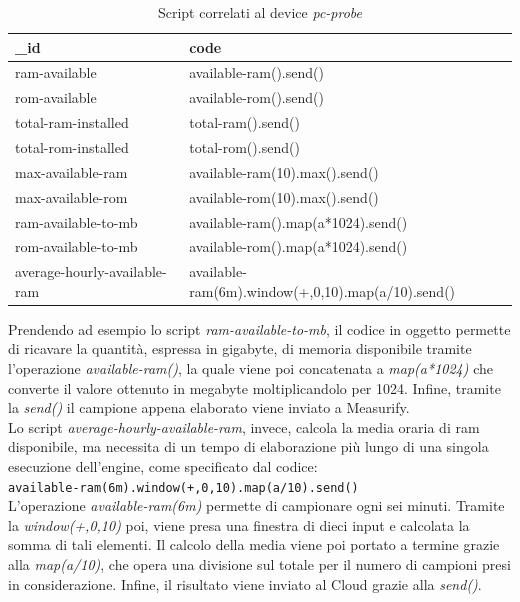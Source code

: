 \begin{table}[H]
	\begin{tabular}{|p{}|p{}|}
		\hline
		\textbf{\_id} & \textbf{code} \\
		\hline
		ram-available & available-ram().send()\\
		\hline
		rom-available & available-rom().send()\\
		\hline
		total-ram-installed & total-ram().send()\\
		\hline
		total-rom-installed & total-rom().send()\\
		\hline
		max-available-ram & available-ram(10).max().send()\\	
		\hline
		max-available-rom & available-rom(10).max().send()\\
		\hline	
		ram-available-to-mb & available-ram().map(a*1024).send()\\
		\hline
		rom-available-to-mb & available-rom().map(a*1024).send()\\
		\hline
		average-hourly-available-ram & available-ram(6m).window(+,0,10).map(a/10).send()\\
		\hline
	\end{tabular}
	\caption{Script correlati al device \textit{pc-probe}}
	\label{script}
\end{table}
Prendendo ad esempio lo script \textit{ram-available-to-mb}, il codice in oggetto permette di ricavare la quantità, espressa in gigabyte, di memoria disponibile tramite l’operazione \textit{available-ram()}, la quale viene poi concatenata a \textit{map(a*1024)} che converte il valore ottenuto in megabyte moltiplicandolo per 1024. Infine, tramite la \textit{send()} il campione appena elaborato viene inviato a Measurify.\\
Lo script \textit{average-hourly-available-ram}, invece, calcola la media oraria di ram disponibile, ma necessita di un tempo di elaborazione più lungo di una singola esecuzione dell'engine, come specificato dal codice:\\ \texttt{available-ram(6m).window(+,0,10).map(a/10).send()}\\ L’operazione \textit{available-ram(6m)} permette di campionare ogni sei minuti. Tramite la \textit{window(+,0,10)} poi, viene presa una finestra di dieci input e calcolata la somma di tali elementi. Il calcolo della media viene poi portato a termine grazie alla \textit{map(a/10)}, che opera una divisione sul totale per il numero di campioni presi in considerazione. Infine, il risultato viene inviato al Cloud grazie alla \textit{send()}.\\ 
